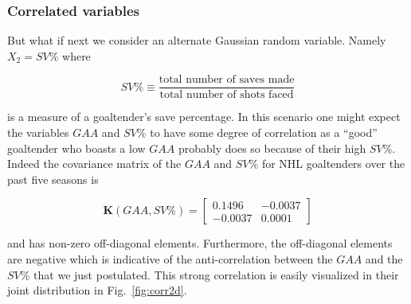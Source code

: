 \subsubsection{Correlated variables}
But what if next we consider an alternate Gaussian random variable. Namely
$X_2 = SV$\% where

\begin{equation}
  SV\% \equiv \frac{\text{total number of saves made}}{\text{total number of shots faced}}
\end{equation}

\noindent is a measure of a goaltender's save percentage. In this scenario one
might expect the variables $GAA$ and $SV$\% to have some degree of correlation
as a ``good'' goaltender who boasts a low $GAA$ probably does so because of their
high $SV$\%. Indeed the covariance matrix of the $GAA$ and $SV$\% for NHL
goaltenders over the past five seasons is

\begin{equation}
  \mathbf{K}(GAA,SV\%) =
  \begin{bmatrix}
    0.1496 & -0.0037 \\
    -0.0037 & 0.0001
  \end{bmatrix}
  \label{eq:Kcorr}
\end{equation}

\noindent and has non-zero off-diagonal elements. Furthermore, the off-diagonal
elements are negative which is indicative of the anti-correlation between the
$GAA$ and the $SV$\% that we just postulated. This strong correlation
is easily visualized in their joint distribution in Fig.~\ref{fig:corr2d}. \\


